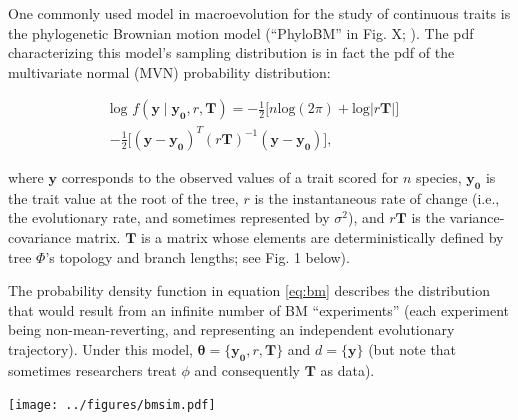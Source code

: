 \documentclass[oneside]{article}
\begin{document}
\begin{tcolorbox}[breakable, width=\textwidth, colback=gray!10, boxrule=0pt,
  title=Box 1: Models characterized by well-known parametric distributions, fonttitle=\bfseries]
  \small 
  One commonly used model in macroevolution for the study
of continuous traits is the phylogenetic Brownian motion model (``PhyloBM'' in Fig. X;
\citealt{felsenstein73}).
The pdf characterizing this model's sampling distribution is in fact
the pdf of the multivariate normal (MVN) probability distribution:

\begin{equation}
  \begin{split}
    \text{log }f(\boldsymbol{y} \mid \boldsymbol{y_0}, r, \boldsymbol{T}) = -\frac{1}{2} \Big[ n\text{log}(2\pi) + \text{log}|r \boldsymbol{T}| \Big] & \\
    -\frac{1}{2} \Big[ (\mathbf{y} - \boldsymbol{y_0})^T (r \boldsymbol{T})^{-1} (\mathbf{y} - \boldsymbol{y_0}) \Big],
  \label{eq:bm}
  \end{split}
\end{equation}

\noindent where $\boldsymbol{y}$ corresponds to the observed values of a trait
scored for $n$ species, $\boldsymbol{y_0}$ is the trait value at the root of the tree,
$r$ is the instantaneous rate of change (i.e., the evolutionary rate, and sometimes
represented by $\sigma^2$), and $r\boldsymbol{T}$ is the variance-covariance matrix.
$\boldsymbol{T}$ is a matrix whose elements are deterministically defined by tree
$\Phi$'s topology and branch lengths; see Fig. 1 below).

\vspace{.25cm}
The probability density function in equation \eqref{eq:bm} describes the distribution
that would result from an infinite number of BM ``experiments'' (each experiment
being non-mean-reverting, and representing an independent evolutionary trajectory).
Under this model, $\boldsymbol{\theta} = \{\boldsymbol{y_0}, r, \boldsymbol{T}\}$ and
$d = \{\boldsymbol{y}\}$ (but note that sometimes researchers treat $\phi$ and
consequently $\boldsymbol{T}$ as
data).

\begin{center}
\texttt{[image: ../figures/bmsim.pdf]}
\label{fig:bmsim}
\end{center}


\end{tcolorbox}
\end{document}
